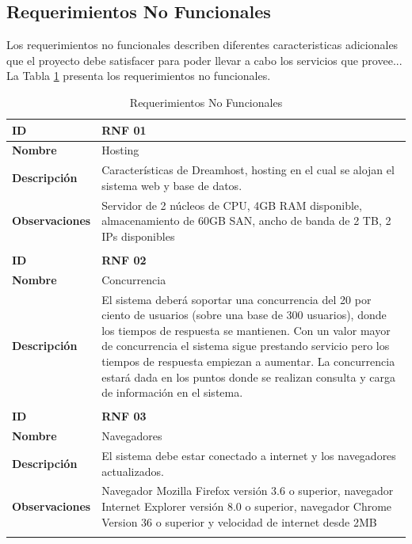 \subsection{Requerimientos No Funcionales}
Los requerimientos no funcionales describen diferentes caracteristicas adicionales que el proyecto debe satisfacer para poder llevar a cabo los servicios que provee... La Tabla \ref{table:Requerimientos-No-Funcionales} presenta los requerimientos no funcionales.

\begin{center}
\begin{longtable}{p{3cm} p{12cm}}
\caption{Requerimientos No Funcionales}
\label{table:Requerimientos-No-Funcionales}
\\ \hline \hline

\textbf{ID} & \textbf{RNF 01} \\ \hline
\textbf{Nombre} & Hosting \\ \hline
\textbf{Descripción} & Características de Dreamhost, hosting en el cual se alojan el sistema web y base de datos.  \\ \hline
\textbf{Observaciones} & Servidor de 2 núcleos de CPU, 4GB RAM disponible, almacenamiento de 60GB SAN, ancho de banda de 2 TB, 2 IPs disponibles \\ \hline 
\hline \\ \hline \hline

\textbf{ID} & \textbf{RNF 02} \\ \hline
\textbf{Nombre} & Concurrencia \\ \hline
\textbf{Descripción} & El sistema deberá soportar una concurrencia del 20 por ciento de usuarios (sobre una base de 300 usuarios), donde los tiempos de respuesta se mantienen.  Con un valor mayor de concurrencia el sistema sigue prestando servicio pero los tiempos de respuesta empiezan a aumentar. La concurrencia estará dada en los puntos donde se realizan consulta y carga de información en el sistema. \\ \hline
\hline \\ \hline \hline

\textbf{ID} & \textbf{RNF 03} \\ \hline
\textbf{Nombre} & Navegadores \\ \hline
\textbf{Descripción} & El sistema debe estar conectado a internet y los navegadores actualizados. \\ \hline
\textbf{Observaciones} & Navegador Mozilla Firefox versión 3.6 o superior, navegador Internet Explorer versión 8.0 o superior, navegador Chrome Version 36 o superior y velocidad de internet desde 2MB \\ \hline
\hline \\ \hline \hline


\end{longtable}
\end{center}
